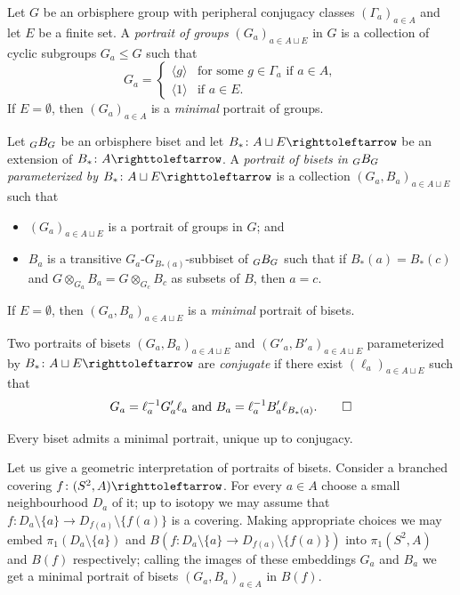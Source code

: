\documentclass{amsart}
\begin{document}
\begin{defn}\label{dfn:PrtrOfBst}
  Let $G$ be an orbisphere group with peripheral conjugacy classes
  $(\Gamma_a)_{a\in A}$ and let $E$ be a finite set. A \emph{portrait
    of groups} $(G_a)_{a\in A\sqcup E}$ in $G$ is a collection of
  cyclic subgroups $G_a\le G$ such that
  \[G_a=\begin{cases} \langle g \rangle &\mbox{for some } g\in \Gamma_a \mbox{ if } a\in A, \\
    \langle1 \rangle & \mbox{if } a \in E.  \end{cases}
  \]
  If $E=\emptyset$, then $(G_a)_{a\in A}$ is a \emph{minimal} portrait
  of groups.

  Let $\subscript GB_G$ be an orbisphere biset and let
  $B_*\colon A\sqcup E\selfmap$ be an extension of
  $B_*\colon A\selfmap$. A \emph{portrait of bisets in $\subscript GB_G$
    parameterized by $B_*\colon A\sqcup E\selfmap$} is a collection
  $(G_a,B_a)_{a\in A \sqcup E}$ such that
  \begin{itemize}
  \item[(A)] $(G_a)_{a\in A \sqcup E}$ is a portrait of groups in $G$;
    and
  \item[(B)] $B_a$ is a transitive $G_a$-$G_{B_*(a)}$-subbiset of
    $\subscript GB_G$ such that if $B_*(a)=B_*(c)$ and
    $G\otimes_{G_a} B_a= G\otimes_{G_c} B_c$ as subsets of $B$, then
    $a=c$.
  \end{itemize}
  If $E=\emptyset$, then $(G_a,B_a)_{a\in A \sqcup E}$ is a
  \emph{minimal} portrait of bisets.

  Two portraits of bisets $(G_a,B_a)_{a\in A\sqcup E}$ and
  $(G'_a,B'_a)_{a\in A\sqcup E}$ parameterized by
  $B_*\colon A\sqcup E\selfmap$ are \emph{conjugate} if there exist
  $(\ell_a)_{a\in A\sqcup E}$ such that
  \begin{equation}
    \label{eq:ConjOfPrtsOfBisets}G_a=\ell_a^{-1}G'_a\ell_a \text{ and } B_a=\ell_a^{-1}B'_a\ell_{B_*(a)}.\qedhere
  \end{equation}
\end{defn}
\noindent Every biset admits a minimal portrait, unique up to conjugacy.

Let us give a geometric interpretation of portraits of
bisets. Consider a branched covering $f\colon (S^2,A)\selfmap$. For
every $a\in A$ choose a small neighbourhood $D_a$ of it; up to isotopy
we may assume that
$f\colon D_a \setminus \{a\}\to D_{f(a)} \setminus \{f(a)\}$ is a
covering. Making appropriate choices we may embed
$\pi_1(D_a\setminus \{a\})$ and
$B(f\colon D_a\setminus \{a\} \to D_{f(a)}\setminus \{f(a)\})$ into
$\pi_1(S^2,A)$ and $B(f)$ respectively; calling the images of these
embeddings $G_a$ and $B_a$ we get a minimal portrait of bisets
$(G_a,B_a)_{a\in A}$ in $B(f)$.
\end{document}
